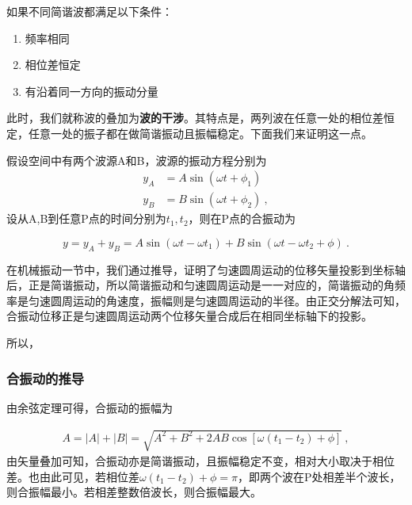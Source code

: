如果不同简谐波都满足以下条件：
\begin{enumerate}
\item 频率相同
\item 相位差恒定
\item 有沿着同一方向的振动分量
\end{enumerate}
此时，我们就称波的叠加为\textbf{波的干涉}。其特点是，两列波在任意一处的相位差恒定，任意一处的振子都在做简谐振动且振幅稳定。下面我们来证明这一点。

假设空间中有两个波源A和B，波源的振动方程分别为
\begin{equation}
\begin{aligned}
y_A&=A\sin(\omega t+\phi_1)\\
y_B&=B\sin (\omega t+\phi_2)~,
\end{aligned}
\end{equation}
设从A,B到任意P点的时间分别为$t_1,t_2$，则在P点的合振动为

\begin{equation}
y=y_A+y_B=A\sin(\omega t-\omega t_1)+B\sin(\omega t-\omega t_2+\phi)~.
\end{equation}

在机械振动一节中，我们通过推导，证明了匀速圆周运动的位移矢量投影到坐标轴后，正是简谐振动，所以简谐振动和匀速圆周运动是一一对应的，简谐振动的角频率是匀速圆周运动的角速度，振幅则是匀速圆周运动的半径。由正交分解法可知，合振动位移正是匀速圆周运动两个位移矢量合成后在相同坐标轴下的投影。

所以，
\subsubsection{合振动的推导}
由余弦定理可得，合振动的振幅为

\begin{equation}
\begin{aligned}
A=|A|+|B|=\sqrt{A^2+B^2+2AB\cos[\omega(t_1-t_2)+\phi]}~,
\end{aligned}
\end{equation}
由矢量叠加可知，合振动亦是简谐振动，且振幅稳定不变，相对大小取决于相位差。也由此可见，若相位差$\omega(t_1-t_2)+\phi=\pi$，即两个波在P处相差半个波长，则合振幅最小。若相差整数倍波长，则合振幅最大。